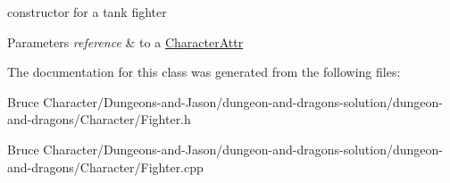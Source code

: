 constructor for a tank fighter 
\begin{DoxyParams}{Parameters}
{\em reference} & to a \hyperlink{class_character_attr}{Character\+Attr} \\
\hline
\end{DoxyParams}


The documentation for this class was generated from the following files\+:\begin{DoxyCompactItemize}
\item 
Bruce Character/\+Dungeons-\/and-\/\+Jason/dungeon-\/and-\/dragons-\/solution/dungeon-\/and-\/dragons/\+Character/Fighter.\+h\item 
Bruce Character/\+Dungeons-\/and-\/\+Jason/dungeon-\/and-\/dragons-\/solution/dungeon-\/and-\/dragons/\+Character/Fighter.\+cpp\end{DoxyCompactItemize}
